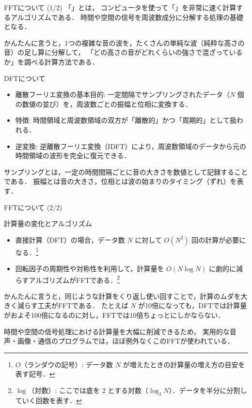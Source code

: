 \documentclass[dvipdfmx,uplatex]{beamer}
\begin{document}
\begin{frame}{FFTについて (1/2)}
  「」とは，
  コンピュータを使って「」を非常に速く計算するアルゴリズムである．
  時間や空間の信号を周波数成分に分解する処理の基礎となる．

  \footnotesize
  かんたんに言うと，1つの複雑な音の波を，たくさんの単純な波（純粋な高さの音）の足し算に分解して，
  「どの高さの音がどれくらいの強さで混ざっているか」を調べる計算方法である．
  \normalsize

  \begin{block}{DFTについて}
    \begin{itemize}
      \item 離散フーリエ変換の基本目的: 一定間隔でサンプリングされたデータ（$N$ 個の数値の並び）を，周波数ごとの振幅と位相に変換する．
      \item 特徴: 時間領域と周波数領域の双方が「離散的」かつ「周期的」として扱われる．
      \item 逆変換: 逆離散フーリエ変換（IDFT）により，周波数領域のデータから元の時間領域の波形を完全に復元できる．
    \end{itemize}
  \end{block}
  \footnotesize
  サンプリングとは，一定の時間間隔ごとに音の大きさを数値として記録することである．
  振幅とは音の大きさ，位相とは波の始まりのタイミング（ずれ）を表す．
\end{frame}

\begin{frame}{FFTについて (2/2)}
  \begin{block}{計算量の変化とアルゴリズム}
    \begin{itemize}
      \item 直接計算（DFT）の場合，データ数 $N$ に対して $O(N^2)$ 回の計算が必要になる．\footnote[frame]{$O$（ランダウの記号）: データ数 $N$ が増えたときの計算量の増え方の目安を表す記号．}
      \item 回転因子の周期性や対称性を利用して，計算量を $O(N \log N)$ に劇的に減らすアルゴリズムがFFTである．\footnote[frame]{$\log$（対数）: ここでは底を 2 とする対数（$\log_2 N$）．データを半分に分割していく回数を表す．}
    \end{itemize}
  \end{block}

  \footnotesize
  かんたんに言うと，同じような計算をくり返し使い回すことで，計算のムダを大きく減らす工夫がFFTである．
  たとえば $N$ が10倍になっても，DFTでは計算量がおよそ100倍になるのに対し，FFTでは10倍ちょっとにしかならない．
  \normalsize

  \vspace{0.5em}
  時間や空間の信号処理における計算量を大幅に削減できるため，
  実用的な音声・画像・通信のプログラムでは，ほぼ例外なくこのFFTが使われている．
\end{frame}
\end{document}
